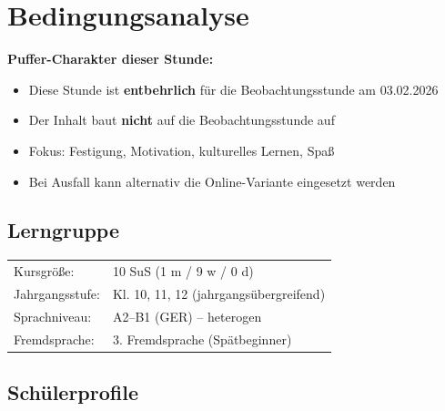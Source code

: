 \documentclass[11pt,a4paper]{article}
\newcommand{\lerngruppengroesse}{10}
\newcommand{\maennlich}{1}
\newcommand{\weiblich}{9}
\newcommand{\divers}{0}
\newcommand{\gerniveau}{A2--B1}
\begin{document}
\tableofcontents
\newpage

\section{Bedingungsanalyse}

\begin{pufferbox}
\textbf{Puffer-Charakter dieser Stunde:}
\begin{itemize}
    \item Diese Stunde ist \textbf{entbehrlich} für die Beobachtungsstunde am 03.02.2026
    \item Der Inhalt baut \textbf{nicht} auf die Beobachtungsstunde auf
    \item Fokus: Festigung, Motivation, kulturelles Lernen, Spaß
    \item Bei Ausfall kann alternativ die Online-Variante eingesetzt werden
\end{itemize}
\end{pufferbox}

\subsection{Lerngruppe}
\begin{tabular}{ll}
    Kursgröße: & \lerngruppengroesse{} SuS (\maennlich{} m / \weiblich{} w / \divers{} d) \\
    Jahrgangsstufe: & Kl. 10, 11, 12 (jahrgangsübergreifend) \\
    Sprachniveau: & \gerniveau{} (GER) -- heterogen \\
    Fremdsprache: & 3. Fremdsprache (Spätbeginner) \\
\end{tabular}

\subsection{Schülerprofile}
\end{document}
